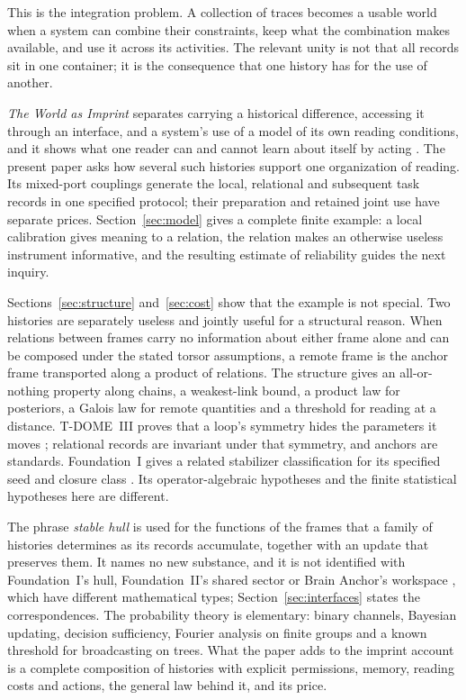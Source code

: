 \documentclass[11pt,a4paper]{article}
\begin{document}
This is the integration problem. A collection of traces becomes a usable world when a system can combine their constraints, keep what the combination makes available, and use it across its activities. The relevant unity is not that all records sit in one container; it is the consequence that one history has for the use of another.

\emph{The World as Imprint} separates carrying a historical difference, accessing it through an interface, and a system's use of a model of its own reading conditions, and it shows what one reader can and cannot learn about itself by acting \cite{WorldImprint}. The present paper asks how several such histories support one organization of reading. Its mixed-port couplings generate the local, relational and subsequent task records in one specified protocol; their preparation and retained joint use have separate prices. Section~\ref{sec:model} gives a complete finite example: a local calibration gives meaning to a relation, the relation makes an otherwise useless instrument informative, and the resulting estimate of reliability guides the next inquiry.

Sections~\ref{sec:structure} and~\ref{sec:cost} show that the example is not special. Two histories are separately useless and jointly useful for a structural reason. When relations between frames carry no information about either frame alone and can be composed under the stated torsor assumptions, a remote frame is the anchor frame transported along a product of relations. The structure gives an all-or-nothing property along chains, a weakest-link bound, a product law for posteriors, a Galois law for remote quantities and a threshold for reading at a distance. T-DOME~III proves that a loop's symmetry hides the parameters it moves \cite{TDOMEIII}; relational records are invariant under that symmetry, and anchors are standards. Foundation~I gives a related stabilizer classification for its specified seed and closure class \cite{FoundationI}. Its operator-algebraic hypotheses and the finite statistical hypotheses here are different.

The phrase \emph{stable hull} is used for the functions of the frames that a family of histories determines as its records accumulate, together with an update that preserves them. It names no new substance, and it is not identified with Foundation~I's hull, Foundation~II's shared sector or Brain Anchor's workspace \cite{FoundationI,FoundationII,BrainAnchor}, which have different mathematical types; Section~\ref{sec:interfaces} states the correspondences. The probability theory is elementary: binary channels, Bayesian updating, decision sufficiency, Fourier analysis on finite groups and a known threshold for broadcasting on trees. What the paper adds to the imprint account is a complete composition of histories with explicit permissions, memory, reading costs and actions, the general law behind it, and its price.
\end{document}
